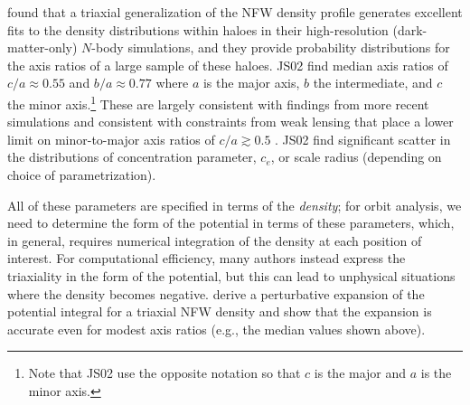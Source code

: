 \citet[][hereafter JS02]{jing02} found that a triaxial generalization of the NFW
density profile \citep{navarro96} generates excellent fits to the density
distributions within haloes in their high-resolution (dark-matter-only) $N$-body
simulations, and they provide probability distributions for the axis ratios of a
large sample of these haloes. JS02 find median axis ratios of $c/a \approx 0.55$
and $b/a \approx 0.77$ where $a$ is the major axis, $b$ the intermediate, and
$c$ the minor axis.\footnote{Note that JS02 use the opposite notation so that
$c$ is the major and $a$ is the minor axis.} These are largely consistent with
findings from more recent simulations \citep[e.g.,][]{bett07, veraciro11,
butsky15, zhu15} and consistent with constraints from weak lensing that place a
lower limit on minor-to-major axis ratios of $c/a\gtrsim0.5$
\citep{vanuitert12}. JS02 find significant scatter in the distributions of
concentration parameter, $c_e$, or scale radius (depending on choice of
parametrization).

All of these parameters are specified in terms of the \emph{density}; for orbit
analysis, we need to determine the form of the potential in terms of these
parameters, which, in general, requires numerical integration of the density at
each position of interest. For computational efficiency, many authors instead
express the triaxiality in the form of the potential, but this can lead to
unphysical situations where the density becomes negative. \citet{leesuto03}
derive a perturbative expansion of the potential integral for a triaxial NFW
density and show that the expansion is accurate even for modest axis ratios
(e.g., the median values shown above).

